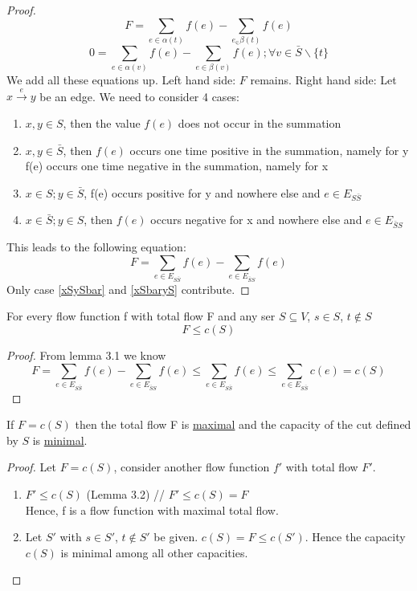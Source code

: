 \begin{proof}
\[ F = \sum_{e \in \alpha(t)} f(e) - \sum_{e_ \in \beta(t)} f(e) \]
\[0 = \sum_{e \in \alpha(v)} f(e) - \sum_{e \in \beta(v)} f(e); \forall v \in \bar{S} \backslash \{t\} \]
We add all these equations up. Left hand side: $F$ remains. Right hand side: Let $x \xrightarrow{e} y$ be an edge. We need to consider 4 cases:
\begin{enumerate}
\item $x, y \in S$, then the value $f(e)$ does not occur in the summation
\item $x, y \in \bar{S}$, then $f(e)$ occurs one time positive in the summation, namely for y \\ f(e) occurs one time negative in the summation, namely for x 
\item $x \in S; y \in \bar{S}$, f(e) occurs positive for y and nowhere else and $e \in E_{S\bar{S}}$  \label{xSySbar}
\item $x \in \bar{S}; y \in S$, then $f(e)$ occurs negative for x and nowhere else and $e \in E_{\bar{S}S}$ \label{xSbaryS}
\end{enumerate}
This leads to the following equation:
\[F = \sum_{e \in E_{S\bar{S}}}f(e) - \sum_{e \in E_{\bar{S}S}} f(e) \]
Only case \ref{xSySbar} and \ref{xSbaryS} contribute.
\end{proof}

\begin{lemma}
For every flow function f with total flow F and any ser $S \subseteq V$, $s \in S$, $t \notin S$
$$ F \le c(S) $$
\end{lemma}

\begin{proof}
From lemma 3.1 we know
\[F = \sum_{e \in E_{S\bar{S}}}f(e) - \sum_{e \in E_{\bar{S}S}}f(e) \le \sum_{e \in E_{S\bar{S}}}f(e) \le \sum_{e \in E_{S\bar{S}}}c(e) = c(S) \] 
\end{proof}

\begin{corollary}
If $F=c(S)$ then the total flow F is \underline{maximal} and the capacity of the cut defined by $S$ is \underline{minimal}.
\end{corollary}

\begin{proof}
Let $F = c(S)$, consider another flow function $f'$ with total flow $F'$.
\begin{enumerate}
\item $F' \le c(S)$ (Lemma 3.2) // $F' \le c(S) = F$ \\Hence, f is a flow function with maximal total flow.
\item Let $S'$ with $s \in S'$, $t \notin S'$ be given. $c(S) = F \le c(S')$. Hence the capacity $c(S)$ is minimal among all other capacities. 
\end{enumerate}
\end{proof}

